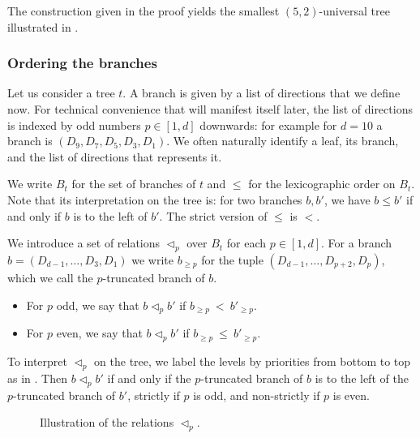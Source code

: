 \noindent The construction given in the proof yields the smallest $(5,2)$-universal tree illustrated in .

\subsubsection*{Ordering the branches}
Let us consider a tree $t$.
A branch is given by a list of directions that we define now.
For technical convenience that will manifest itself later, the list of directions is indexed by odd numbers $p \in [1,d]$ downwards:
for example for $d = 10$ a branch is $(D_9,D_7,D_5,D_3,D_1)$.
We often naturally identify a leaf, its branch, and the list of directions that represents it.

We write $B_t$ for the set of branches of $t$ and $\le$ for the lexicographic order on $B_t$.
Note that its interpretation on the tree is: for two branches $b,b'$, we have $b \le b'$ if and only if $b$ is to the left of $b'$.
The strict version of $\le$ is $<$.

We introduce a set of relations $\vartriangleleft_p$ over $B_t$ for each $p \in [1,d]$.
For a branch $b = (D_{d-1},\dots,D_3,D_1)$ we write $b_{\ge p}$ for the tuple $(D_{d-1},\dots,D_{p+2},D_p)$,
which we call the $p$-truncated branch of $b$.
\begin{itemize}
	\item For $p$ odd, we say that $b \vartriangleleft_p b'$ 
	if $b_{\ge p}\ <\ b'_{\ge p}$.
	\item For $p$ even, we say that $b \vartriangleleft_p b'$ 
	if $b_{\ge p}\ \le\ b'_{\ge p}$.
\end{itemize}

To interpret $\vartriangleleft_p$ on the tree, we label the levels by priorities from bottom to top as in .
Then $b \vartriangleleft_p b'$ if and only if the $p$-truncated branch of $b$ is to the left of the $p$-truncated branch of $b'$,
strictly if $p$ is odd, and non-strictly if $p$ is even.

\begin{figure*}[!ht]
\centering
{}
\caption{Illustration of the relations $\vartriangleleft_p$.}
\label{3-fig:example_relations}
\end{figure*}

